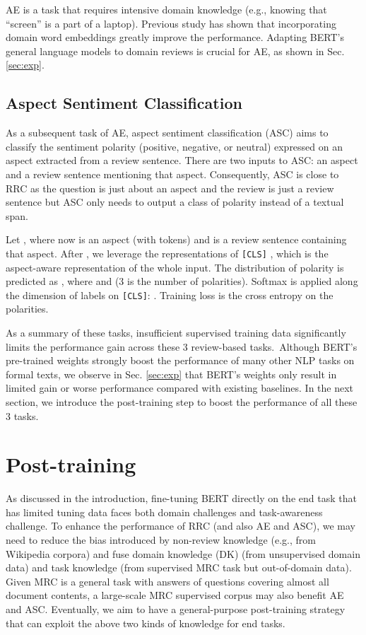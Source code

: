 \documentclass[11pt,a4paper]{article}
\begin{document}
AE is a task that requires intensive domain knowledge (e.g., knowing that ``screen'' is a part of a laptop). Previous study \cite{xu_acl2018} has shown that incorporating domain word embeddings greatly improve the performance. 
Adapting BERT's general language models to domain reviews is crucial for AE,
as shown in Sec. \ref{sec:exp}.

\subsection{Aspect Sentiment Classification}
As a subsequent task of AE, aspect sentiment classification (ASC) aims to classify the sentiment polarity (positive, negative, or neutral) expressed on an aspect extracted from a review sentence.
There are two inputs to ASC: an aspect and a review sentence mentioning that aspect.
Consequently, ASC is close to RRC as the question is just about an aspect and the review is just a review sentence but ASC only needs to output a class of polarity instead of a textual span.

Let , where  now is an aspect (with  tokens) and  is a review sentence containing that aspect.
After , we leverage the representations of \texttt{[CLS]} , which is the aspect-aware representation of the whole input.
The distribution of polarity is predicted as , where  and  (3 is the number of polarities). Softmax is applied along the dimension of labels on \texttt{[CLS]}: .
Training loss is the cross entropy on the polarities.

As a summary of these tasks, insufficient supervised training data significantly limits the performance gain across these 3 review-based tasks.~Although BERT's pre-trained weights strongly boost the performance of many other NLP tasks on formal texts, we observe in Sec. \ref{sec:exp} that BERT's weights only result in limited gain or worse performance compared with existing baselines.
In the next section, we introduce the post-training step to boost the performance of all these 3 tasks.

\section{Post-training}
\label{sec:pt}
As discussed in the introduction, fine-tuning BERT directly on the end task that has limited tuning data faces both domain challenges and task-awareness challenge.
To enhance the performance of RRC (and also AE and ASC), we may need to reduce the bias introduced by non-review knowledge (e.g., from Wikipedia corpora) and fuse domain knowledge (DK) (from unsupervised domain data) and task knowledge (from supervised MRC task but out-of-domain data).
Given MRC is a general task with answers of questions covering almost all document contents, a large-scale MRC supervised corpus may also benefit AE and ASC.
Eventually, we aim to have a general-purpose post-training strategy that can exploit the above two kinds of knowledge for end tasks.
\end{document}
